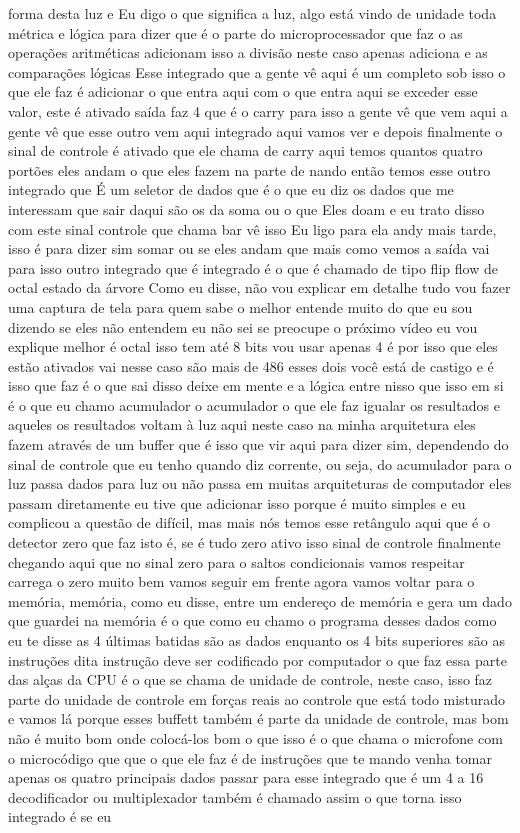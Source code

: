 \documentclass[oneside,11pt]{memoir} %
\begin{document}
forma desta luz e  Eu digo o que significa a luz, algo está vindo  de unidade  toda métrica e lógica para dizer que é o  parte do microprocessador que faz o  as operações aritméticas adicionam isso  a divisão neste caso apenas adiciona e  as comparações lógicas  Esse integrado que a gente vê aqui é um completo  sob isso o que ele faz é adicionar o que  entra aqui com o que entra aqui  se exceder esse valor, este é ativado  saída faz 4 que é o carry para isso  a gente vê que vem aqui  a gente vê que esse outro vem aqui  integrado aqui vamos ver e depois  finalmente o sinal de controle é ativado  que ele chama de carry  aqui temos quantos quatro portões  eles andam o que eles fazem na parte de  nando  então temos esse outro integrado que  É um seletor de dados que é o que eu  diz os dados que me interessam que  sair daqui são os da soma ou o que  Eles doam e eu trato disso com este sinal  controle que chama bar vê isso  Eu ligo para ela andy mais tarde, isso é para dizer sim  somar ou se eles andam  que mais como vemos a saída vai para isso  outro integrado que é integrado é o  que é chamado de tipo flip flow de octal  estado da árvore  Como eu disse, não vou explicar em  detalhe tudo vou fazer uma captura de tela  para quem sabe o melhor  entende muito do que eu sou  dizendo se eles não entendem eu não sei  se preocupe o próximo vídeo eu vou  explique melhor é octal  isso tem até 8 bits vou usar  apenas 4 é por isso que eles estão ativados  vai nesse caso são mais de 486 esses dois  você está de castigo e é isso que  faz é o que sai disso  deixe em mente e a lógica entre nisso  que isso em si é o que eu chamo  acumulador o acumulador o que ele faz  igualar os resultados e aqueles  os resultados voltam à luz aqui  neste caso na minha arquitetura eles fazem  através de um buffer que é isso que  vir aqui para dizer sim, dependendo do  sinal de controle que eu tenho quando diz  corrente, ou seja, do acumulador para o  luz passa dados para luz ou não passa  em muitas arquiteturas de computador  eles passam diretamente eu tive que adicionar  isso porque é muito simples e eu  complicou a questão de difícil, mas mais  nós temos esse retângulo aqui que  é o detector zero que faz  isto é, se é tudo zero ativo isso  sinal de controle finalmente chegando  aqui que no sinal zero para o  saltos condicionais vamos respeitar  carrega o zero  muito bem vamos seguir em frente agora vamos voltar para o  memória, memória, como eu disse, entre  um endereço de memória e gera um dado  que guardei na memória é o que  como eu chamo o programa  desses dados como eu te disse  as 4 últimas batidas são as  dados enquanto os 4 bits superiores  são as instruções  dita instrução deve ser  codificado por computador o que  faz essa parte das alças da CPU  é o que se chama de unidade de  controle, neste caso, isso faz parte do  unidade de controle em forças reais  ao controle que está todo misturado e  vamos lá porque esses buffett também é  parte da unidade de controle, mas bom  não é muito bom onde colocá-los bom o que  isso é o que chama o microfone com o  microcódigo que  que o que ele faz é de  instruções que te mando venha tomar  apenas os quatro principais dados  passar para esse integrado que é um  4 a 16 decodificador ou multiplexador  também é chamado assim o que torna isso  integrado é se eu 
\end{document}

